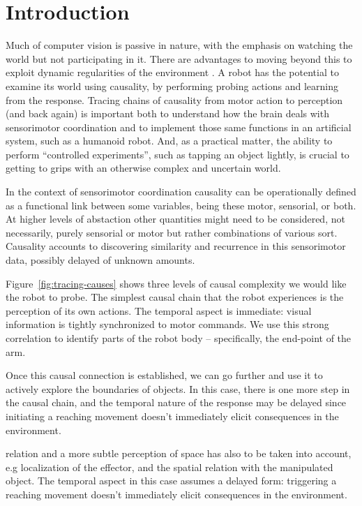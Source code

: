 

\section{Introduction}

\label{sect:introduction}

Much of computer vision is passive in nature, with the emphasis on
watching the world but not participating in it.  There are advantages
to moving beyond this to exploit dynamic regularities of the
environment \cite{ballard91animate}.
A robot has the
potential to examine its world using causality, by performing probing
actions and learning from the response.  Tracing chains of causality
from motor action to perception (and back again) is important both to
understand how the brain deals with sensorimotor coordination and to
implement those same functions in an artificial system, such as a
humanoid robot.  And, as a practical matter, the ability to perform
``controlled experiments'', such as tapping an object lightly, is
crucial to getting to grips with an otherwise complex and uncertain
world.

\ifverbose
In the context of sensorimotor coordination causality can be operationally
defined as a functional link between some variables, being these motor,
sensorial, or both.  At higher levels of abstaction other quantities might
need to be considered, not necessarily, purely sensorial or motor but
rather combinations of various sort. Causality accounts to discovering
similarity and recurrence in this sensorimotor data, possibly delayed of
unknown amounts.
\fi


Figure~\ref{fig:tracing-causes} shows three levels of causal complexity
we would like the robot to probe.
The simplest causal chain that the robot experiences is the
perception of its own actions.  The temporal aspect is immediate:
visual information is tightly synchronized to motor commands.
We use this strong correlation to identify parts of the robot
body -- specifically, the end-point of the arm. 

Once this causal connection is established, we can go further and use
it to actively explore the boundaries of objects.  In this case, there
is one more step in the causal chain, and the temporal nature of
the response may be delayed since initiating a reaching movement doesn't
immediately elicit consequences in the environment.  

\ifverbose
relation and a
more subtle perception of space has also to be taken into account, e.g
localization of the effector, and the spatial relation with the
manipulated object.  The temporal aspect in this case assumes a
delayed form: triggering a reaching movement doesn't immediately
elicit consequences in the environment.

